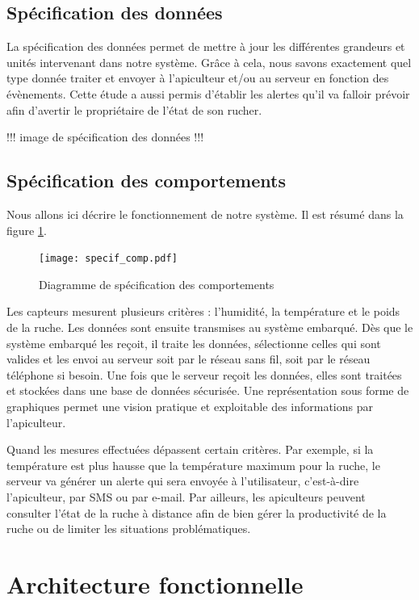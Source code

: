 \section{Spécification des données}
La spécification des données permet de mettre à jour les différentes grandeurs 
et unités intervenant dans notre système. Grâce à cela, nous savons exactement 
quel type donnée traiter et envoyer à l'apiculteur et/ou au serveur en fonction des évènements. Cette étude a aussi permis d'établir les alertes qu'il va falloir prévoir afin d'avertir le propriétaire de l'état de son rucher. 

!!!  image de spécification des données  !!!

\section{Spécification des comportements}

Nous allons ici décrire le fonctionnement de notre système. Il est résumé dans la figure \ref{fig:sp_comp}.

\begin{figure}[h]
\centering\texttt{[image: specif\_comp.pdf]}
\caption{\label{fig:sp_comp} Diagramme de spécification des comportements}
\end{figure}

Les capteurs mesurent plusieurs critères : l'humidité, la température et le poids de la ruche. Les données sont ensuite transmises au système embarqué. Dès que le système embarqué les reçoit, il traite les données, sélectionne celles qui sont valides et les envoi au serveur soit par le réseau sans fil, soit par le réseau téléphone si besoin. Une fois que le serveur reçoit les données, elles sont traitées et stockées dans une base de données sécurisée. Une représentation sous forme de graphiques permet une vision pratique et exploitable des informations par l'apiculteur.

Quand les mesures effectuées dépassent certain critères. Par exemple, si la température est plus hausse que la température maximum pour la ruche, le serveur va générer un alerte qui sera envoyée à l'utilisateur, c’est-à-dire l'apiculteur, par SMS ou par e-mail. Par ailleurs, les apiculteurs peuvent consulter l’état de la ruche à distance afin de bien gérer la productivité de la ruche ou de limiter les situations problématiques. 


\chapter{Architecture fonctionnelle}


